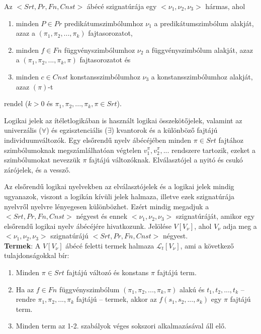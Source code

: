\documentclass[margin=0px]{article}
\begin{document}
	\noindent Az $<Srt, Pr, Fn, Cnst>$ ábécé szignatúrája egy $<\nu_{1}, \nu_{2}, \nu_{3}>$ hármas, ahol
	
	\begin{enumerate}
		\item	minden $P \in Pr$ predikátumszimbólumhoz $\nu_{1}$ a predikátumszimbólum alakját,
		azaz a $(\pi_{1}, \pi_{2}, ..., \pi_{k})$ fajtasorozatot,
		
		\item	minden $f \in Fn$ függvényszimbólumhoz $\nu_{2}$ a függvényszimbólum alakját,
		azaz a $(\pi_{1}, \pi_{2}, ..., \pi_{k}, \pi)$ fajtasorozatot és

		\item	minden $c \in Cnst$ konstansszimbólumhoz $\nu_{3}$ a konstansszimbólumhoz alakját,
		azaz $(\pi)$-t
	\end{enumerate}
	
	\noindent rendel ($k > 0$ és $\pi_{1}, \pi_{2}, ..., \pi_{k}, \pi \in Srt$). 
	
	Logikai jelek az ítéletlogikában is használt logikai összekötőjelek, valamint az univerzális ($\forall$)
	és egzisztenciális ($\exists$) kvantorok és a különböző fajtájú individuumváltozók. Egy elsőrendű
	nyelv ábécéjében minden $\pi \in Srt$ fajtához szimbólumoknak megszámlálhatóan végtelen
	$v_{1}^{\pi}, v_{2}^{\pi}, ...$ rendszere tartozik, ezeket a szimbólumokat nevezzük $\pi$ fajtájú
	változóknak. Elválasztójel a nyitó és csukó zárójelek, és a vessző.
	
	Az elsőrendű logikai nyelvekben az elválasztójelek és a logikai jelek mindig ugyanazok, viszont
	a logikán kívüli jelek halmaza, illetve ezek szignatúrája nyelvről nyelvre lényegesen különbözhet.
	Ezért mindig megadjuk a $<Srt, Pr, Fn, Cnst>$ négyest és ennek $<\nu_{1}, \nu_{2}, \nu_{3}>$
	szignatúráját, amikor egy elsőrendű logikai nyelv ábécéjére hivatkozunk. Jelölése $V[V_{\nu}]$,
	ahol $V_{\nu}$ adja meg a $<\nu_{1}, \nu_{2}, \nu_{3}>$ szignatúrájú $<Srt, Pr, Fn, Cnst>$ négyest.\\
	
	\noindent \textbf{Termek}: A $V[V_{\nu}]$ ábécé feletti termek halmaza $\mathcal{L}_{t}[V_{\nu}]$, ami
	a következő tulajdonságokkal bír:
	
	\begin{enumerate}
		\item	Minden $\pi \in Srt$ fajtájú változó és konstans $\pi$ fajtájú term.
		
		\item	Ha az $f \in Fn$ függvényszimbólum $(\pi_{1}, \pi_{2}, ..., \pi_{k}, \pi)$ alakú
		és $t_{1}, t_{2}, ..., t_{k}$ -- rendre $\pi_{1}, \pi_{2}, ..., \pi_{k}$ fajtájú -- termek,
		akkor az $f(s_{1}, s_{2}, ..., s_{k})$ egy $\pi$ fajtájú term.
		
		\item	Minden term az 1-2. szabályok véges sokszori alkalmazásával áll elő.
	\end{enumerate}
	
\end{document}
